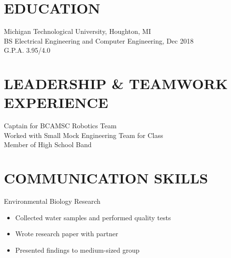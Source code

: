 \documentclass[letterpaper]{res}
\begin{document}
 


\address{\bf  PRESENT ADDRESS \\ 51280 Blue Top Cabin Rd \\ Houghton, MI 49931}
\address{\bf PERMANENT ADDRESS \\ 14200 Stone Jug Road \\  Battle Creek, MI 49015 \\  (269) 262-6098 \\ jaevanko@mtu.edu}
                                  
\begin{resume}

 
\section{EDUCATION}          
    Michigan Technological University, Houghton, MI  \\        
    BS Electrical Engineering and Computer Engineering, Dec 2018   \\      
    G.P.A. 3.95/4.0          

\section{LEADERSHIP \& TEAMWORK EXPERIENCE}
	Captain for BCAMSC Robotics Team \\
	Worked with Small Mock Engineering Team for Class \\
	Member of High School Band

\section{COMMUNICATION SKILLS}
	Environmental Biology Research
	\begin{itemize} \itemsep1pt \parskip0pt 
		\item Collected water samples and performed quality tests
		\item Wrote research paper with partner
		\item Presented findings to medium-sized group
	\end{itemize}


\end{resume}
\end{document}

